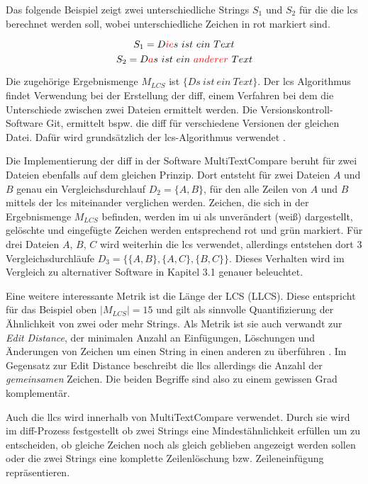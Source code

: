 Das folgende Beispiel zeigt zwei unterschiedliche Strings $S_1$ und $S_2$ für die die \acrshort{lcs} berechnet werden soll, wobei unterschiedliche Zeichen in rot markiert sind.

\[ S_1 = \color{black} D \color{red}ie \color{black}s \ ist \ ein \ Text\]
\[ S_2 = D\color{red}a\color{black}s \  ist \  ein  \ \color{red}anderer\color{black} \ Text\]

Die zugehörige Ergebnismenge $M_{LCS}$ ist $ \{Ds \ ist \ ein \ Text\}$. Der \acrshort{lcs} Algorithmus findet Verwendung bei der Erstellung der \acrfull{diff}, einem Verfahren bei dem die Unterschiede zwischen zwei Dateien ermittelt werden. Die Versionskontroll-Software Git, ermittelt bspw. die \acrshort{diff} für verschiedene Versionen der gleichen Datei. Dafür wird grundsätzlich der \acrshort{lcs}-Algorithmus verwendet \autocite{diffLCS}.

Die Implementierung der \acrshort{diff} in der Software MultiTextCompare beruht für zwei Dateien ebenfalls auf dem gleichen Prinzip. Dort entsteht für zwei Dateien $A $ und $B$ genau ein Vergleichsdurchlauf $D_2 = \{A,B\}$, für den alle Zeilen von $A$ und $B$ mittels der \acrshort{lcs} miteinander verglichen werden. Zeichen, die sich in der Ergebnismenge $M_{LCS}$ befinden, werden im \acrfull{ui} als unverändert (weiß) dargestellt, gelöschte und eingefügte Zeichen werden entsprechend rot und grün markiert.
Für drei Dateien $A$, $B$, $C$ wird weiterhin die \acrshort{lcs} verwendet, allerdings entstehen dort 3 Vergleichsdurchläufe $D_3 = \{ \{A,B\}, \{A,C\}, \{B,C\} \}$. Dieses Verhalten wird im Vergleich zu alternativer Software in Kapitel 3.1 genauer beleuchtet. 

Eine weitere interessante Metrik ist die Länge der LCS (LLCS). Diese entspricht für das Beispiel oben $|M_{LCS}| = 15$ und gilt als sinnvolle Quantifizierung der Ähnlichkeit von zwei oder mehr Strings. Als Metrik ist sie auch verwandt zur \textit{Edit Distance}, der minimalen Anzahl an Einfügungen, Löschungen und Änderungen von Zeichen um einen String in einen anderen zu überführen \autocite{llcs}. Im Gegensatz zur Edit Distance beschreibt die \acrshort{llcs} allerdings die Anzahl der \textit{gemeinsamen} Zeichen. Die beiden Begriffe sind also zu einem gewissen Grad komplementär.


Auch die \acrshort{llcs} wird innerhalb von MultiTextCompare verwendet. Durch sie wird im \acrshort{diff}-Prozess festgestellt ob zwei Strings eine Mindestähnlichkeit erfüllen um zu entscheiden, ob gleiche Zeichen noch als gleich geblieben angezeigt werden sollen oder die zwei Strings eine komplette Zeilenlöschung bzw. Zeileneinfügung repräsentieren.

